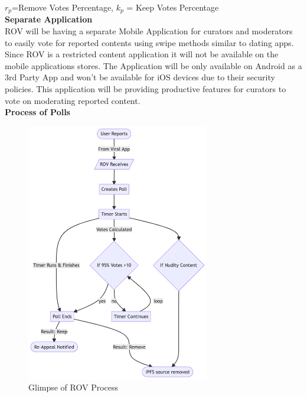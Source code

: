 \documentclass[10pt]{article}
\begin{document}
$r_p$=Remove Votes Percentage, $k_p$ = Keep Votes Percentage\\

\textbf{Separate Application}\\

ROV will be having a separate Mobile Application for curators and moderators to easily vote for reported contents using swipe methods similar to dating apps. Since ROV is a restricted content application it will not be available on the mobile applications stores. The Application will be only available on Android as a 3rd Party App and won’t be available for iOS devices due to their security policies. This application will be providing productive features for curators to vote on moderating reported content. \\

\textbf{Process of Polls}\\



\begin{figure}[H]
\begin{center}
\includegraphics[width=8cm]{rov-poll}
\caption{Glimpse of ROV Process}
\end{center}
\end{figure}

\end{document}
